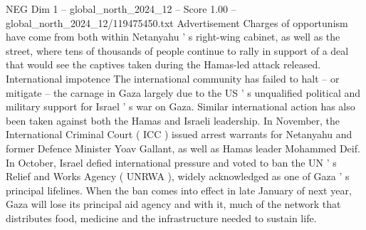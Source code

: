 \begin{textsample}{NEG Dim 1 – global\_north\_2024\_12 – Score 1.00 – global\_north\_2024\_12/119475450.txt}
Advertisement Charges of opportunism have come from both within Netanyahu ' s right-wing cabinet, as well as the street, where tens of thousands of people continue to rally in support of a deal that would see the captives taken during the Hamas-led attack released.
International impotence The international community has failed to halt -- or mitigate -- the carnage in Gaza largely due to the US ' s unqualified political and military support for Israel ' s war on Gaza.
Similar international action has also been taken against both the Hamas and Israeli leadership.
In November, the International Criminal Court ( ICC ) issued arrest warrants for Netanyahu and former Defence Minister Yoav Gallant, as well as Hamas leader Mohammed Deif.
In October, Israel defied international pressure and voted to ban the UN ' s Relief and Works Agency ( UNRWA ), widely acknowledged as one of Gaza ' s principal lifelines.
When the ban comes into effect in late January of next year, Gaza will lose its principal aid agency and with it, much of the network that distributes food, medicine and the infrastructure needed to sustain life.

\end{textsample}
